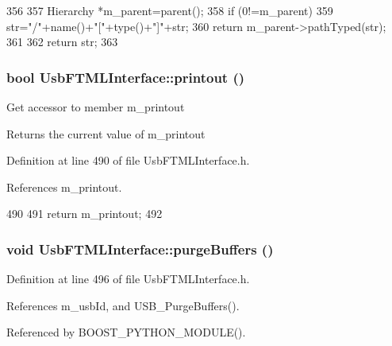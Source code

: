 \begin{DoxyCode}
356                                            {
357   Hierarchy *m_parent=parent();
358   if (0!=m_parent){
359     str="/"+name()+"["+type()+"]"+str;
360     return m_parent->pathTyped(str);
361   }
362   return str;
363 }
\end{DoxyCode}
\hypertarget{classUsbFTMLInterface_a1045e3851406cf07e31c498d0de230e1}{
\subsubsection[{printout}]{\setlength{\rightskip}{0pt plus 5cm}bool UsbFTMLInterface::printout ()}}
\label{classUsbFTMLInterface_a1045e3851406cf07e31c498d0de230e1}
Get accessor to member m\_\-printout \begin{DoxyReturn}{Returns}
the current value of m\_\-printout 
\end{DoxyReturn}


Definition at line 490 of file UsbFTMLInterface.h.

References m\_\-printout.


\begin{DoxyCode}
490                    {
491     return m_printout;
492   }
\end{DoxyCode}
\hypertarget{classUsbFTMLInterface_ad5c6964b2618149f33c258f896e9f113}{
\subsubsection[{purgeBuffers}]{\setlength{\rightskip}{0pt plus 5cm}void UsbFTMLInterface::purgeBuffers ()}}
\label{classUsbFTMLInterface_ad5c6964b2618149f33c258f896e9f113}


Definition at line 496 of file UsbFTMLInterface.h.

References m\_\-usbId, and USB\_\-PurgeBuffers().

Referenced by BOOST\_\-PYTHON\_\-MODULE().


